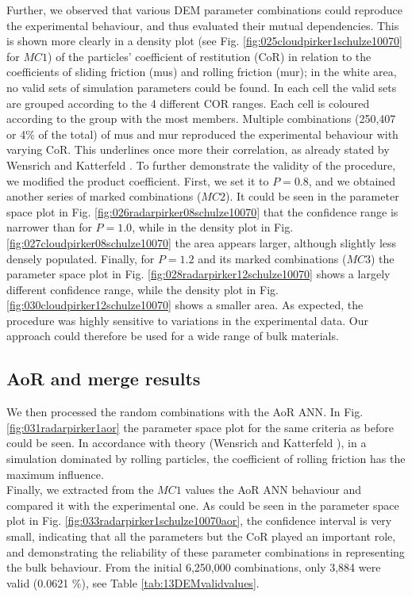Further, we observed that various \acs{DEM} parameter
combinations could reproduce the experimental behaviour, and thus evaluated
their mutual dependencies.
This is shown more clearly in a density plot (see Fig. 
\ref{fig:025cloudpirker1schulze10070} for $MC1$) 
of the particles' coefficient of restitution (\acs{CoR}) in relation to
the coefficients of sliding friction (\acs{mus}) and rolling friction (\acs{mur}); 
in the white area, no valid sets of simulation parameters could be found.
In each cell the valid sets are grouped according to the 4 different COR
ranges.
Each cell is coloured according to the group with the most members.
Multiple
combinations (250,407 or 4\% of the total) of \acs{mus} and \acs{mur} reproduced
the experimental behaviour with varying \acs{CoR}.
This underlines once more their correlation, as already stated by Wensrich and 
Katterfeld \cite{RefWorks:87}.
To further demonstrate the validity of the procedure, we modified the product
coefficient. 
First, we set it to $P=0.8$, and we obtained another
series of marked combinations ($MC2$).
It could be seen in the parameter space plot in Fig.
\ref{fig:026radarpirker08schulze10070} that the confidence range is narrower
than for $P=1.0$, while in the density plot in Fig. 
\ref{fig:027cloudpirker08schulze10070} the area
appears larger, although slightly less densely populated. Finally, for $P=1.2$
and its marked combinations ($MC3$) the parameter space plot in Fig.
\ref{fig:028radarpirker12schulze10070} shows a largely different confidence
range, while the density plot in Fig. \ref{fig:030cloudpirker12schulze10070} 
shows a smaller area. As expected, the procedure was highly sensitive to
variations in the experimental data.
Our approach could therefore be used
for a wide range of bulk materials.\\

\subsection{AoR and merge results}
\label{subsec:aorandmergeresults}

We then processed the random combinations with the \acs{AoR} \acs{ANN}. In Fig.
\ref{fig:031radarpirker1aor} the parameter space plot for the same criteria as
before could be seen.
In accordance with theory (Wensrich and Katterfeld \cite{RefWorks:87}), in a simulation dominated
by rolling particles, the coefficient of rolling friction has the maximum
influence. \\
Finally, we extracted from the $MC1$ values the \acs{AoR} \acs{ANN} behaviour
and compared it with the experimental one.
As could be seen in the parameter space plot in Fig.
\ref{fig:033radarpirker1schulze10070aor}, the confidence interval is very small,
indicating that all the parameters but the \acs{CoR} played an important role, 
and demonstrating the reliability of these parameter
combinations in representing the bulk behaviour.
From the initial 6,250,000 combinations, only 3,884 were valid (0.0621
\%), see Table \ref{tab:13DEMvalidvalues}.


